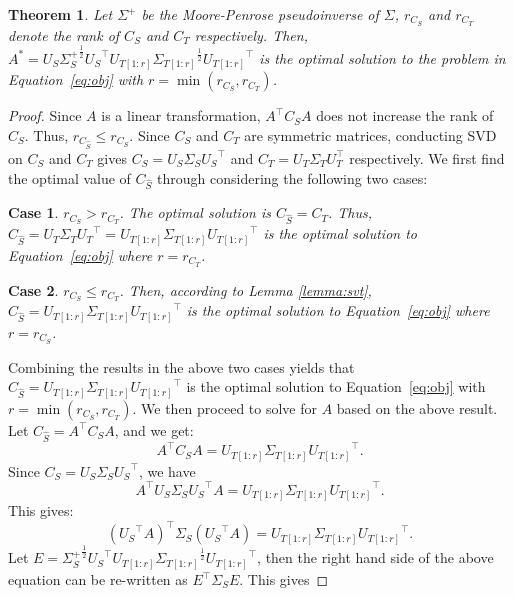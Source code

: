 \documentclass[letterpaper]{article}
\newtheorem{theorem}{Theorem}
\newtheorem{case}{Case}
\begin{document}
\begin{theorem}
Let $\Sigma^{+}$ be the Moore-Penrose pseudoinverse of $\Sigma$, $r_{C_S}$ and $r_{C_T}$ denote the rank of $C_S$ and $C_T$ respectively.
Then, $A^{*} = U_{S}{\Sigma_S^{+}}^{\frac{1}{2}}{U_{S}}^{\top} U_{T[1:r]}{\Sigma_{T[1:r]}}^{\frac{1}{2}}{U_{T[1:r]}}^{\top}$ is the optimal solution to the problem in Equation~\eqref{eq:obj} with $r = \min(r_{C_S}, r_{C_T})$.
\end{theorem}
\begin{proof}  Since $A$ is a linear transformation, $A^{\top}C_SA$ does not increase the rank of $C_S$. Thus, $r_{C_{\hat{S}}}\leqslant{r_{C_{S}}}$. Since $C_S$ and $C_T$ are symmetric matrices, conducting SVD on $C_S$ and $C_T$ gives $C_S=U_S{\Sigma_S}{U_S}^{\top}$ and $C_T = U_T\Sigma_TU_T^\top$ respectively. We first find the optimal value of $C_{\hat{S}}$ through considering the following two  cases:
\begin{case}
$r_{C_S}>{r_{C_T}}$. The optimal solution is $C_{\hat{S}} = C_T$. Thus, $C_{\hat{S}} = U_{T}{\Sigma_{T}}{U_{T}}^{\top} = U_{T[1:r]}{\Sigma_{T[1:r]}}{U_{T[1:r]}}^{\top}$ is the optimal solution to Equation~\eqref{eq:obj} where $r = r_{C_T}$.
\end{case}
\begin{case}
$r_{C_S}\leqslant{r_{C_T}}$. Then, according to Lemma \ref{lemma:svt}, $C_{\hat{S}} = U_{T[1:r]}{\Sigma_{T[1:r]}}{U_{T[1:r]}}^{\top}$ is the optimal solution to Equation~\eqref{eq:obj} where $r = r_{C_S}$.
\end{case}
Combining the results in the above two cases yields that ${{C_{\hat{S}}}} = U_{T[1:r]}{\Sigma_{T[1:r]}}{U_{T[1:r]}}^{\top}$ is the optimal solution to Equation~\eqref{eq:obj} with $r = \min(r_{C_S}, r_{C_T})$.
We then proceed to solve for $A$ based on the above result.
Let $C_{\hat{S}} = {A}^{\top}C_S A$, and we get:
\begin{equation*}
{A}^{\top}C_{S}{A}= U_{T[1:r]}{\Sigma_{T[1:r]}}{U_{T[1:r]}}^{\top}.
\end{equation*}
Since $C_S = U_S \Sigma_S {U_S}^\top$, we have
\begin{equation*}
{A}^{\top}U_S{\Sigma_S}{U_S}^{\top}{A}= U_{T[1:r]}{\Sigma_{T[1:r]}}{U_{T[1:r]}}^{\top}.
\end{equation*}
This gives:
\begin{equation*}
{({U_S}^{\top}A)}^{\top}{\Sigma_S}({U_S}^{\top}{A})= U_{T[1:r]}{\Sigma_{T[1:r]}}{U_{T[1:r]}}^{\top}.
\end{equation*}
Let $E ={\Sigma_S^{+}}^{\frac{1}{2}} {U_S}^{\top} {U_{T[1:r]}} {\Sigma_{T[1:r]}}^{\frac{1}{2}}{U_{T[1:r]}}^{\top}$, then the right hand side of the above equation can be re-written as ${E}^{\top}{\Sigma_S}E$. This gives

\end{proof}
\end{document}
